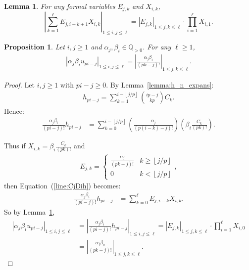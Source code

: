 \documentclass[10pt,a4paper]{amsart}
\newtheorem{lemma}{Lemma}
\newtheorem{prop}{Proposition}
\newcommand{\floor}[1]{\left \lfloor #1 \right \rfloor}
\begin{document}
\begin{lemma}\label{lemma:deter}
For any formal variables $E_{j,k}$ and $X_{i,k}$, 
\[
	|  \sum_{k=1}^{\ell} E_{j, i-k+1} X_{i,k} |_{1\leq i,j\leq \ell} = |E_{j,k}|_{1\leq j,k\leq \ell} \cdot \prod_{i=1}^\ell X_{i,1}.
\]
\end{lemma}

\begin{prop}\label{prop:CD_det}
Let $i,j\geq 1$ and $\alpha_j,\beta_i\in\mathbb{Q}_{>0}$. For any $\ell\geq 1$,
\begin{align*}
	|\alpha_j\beta_iu_{pi-j}|_{1\leq i,j\leq \ell} =  |\frac{\alpha_j\beta_i}{(pk-j)!}|_{1\leq j,k\leq \ell}.
\end{align*}
\end{prop}

\begin{proof}
Let $i,j\geq 1$ with $pi-j\geq 0$. By Lemma~\ref{lemma:h_n_expans}:
\begin{align*}
	h_{pi-j} = \sum_{k=1}^{i-\floor{j/p}}\binom{ip-j}{kp} C_k.
\end{align*}
Hence:
\begin{align}\label{line:CjDih}
	\frac{\alpha_j\beta_i}{(pi-j)!}h_{pi-j} &= \sum_{k=0}^{i-\floor{j/p}}\left (\frac{\alpha_j}{(p(i-k)-j)!}\right )\left (\beta_i\frac{C_k}{(pk)!}\right).
\end{align}

Thus if $X_{i,k} = \beta_i\frac{C_k}{(pk)!}$ and
\begin{align*}
E_{j, k} = \begin{cases}
		\frac{\alpha_j}{(pk-j)!} & k\geq  \floor{j/p}\\
		0 & k< \floor{j/p}
		\end{cases},
\end{align*} 
then Equation~(\ref{line:CjDih}) becomes:
\begin{align}
\frac{\alpha_j\beta_i}{(pi-j)!}h_{pi-j} &= \sum_{k=0}^{\ell}E_{j,i-k}X_{i,k}.
\end{align}
So by Lemma~\ref{lemma:deter},
\begin{align*}
	|\alpha_j\beta_iu_{pi-j}|_{1\leq i,j\leq \ell} &=|\frac{\alpha_j\beta_i}{(pi-j)!}h_{pi-j}|_{1\leq i,j\leq \ell} =  |E_{j,k}|_{1\leq j,k\leq \ell} \cdot \prod_{i=1}^\ell X_{i,0} \\
	&=  |\frac{\alpha_j\beta_k}{(pk-j)!}|_{1\leq j,k\leq \ell}.
\end{align*}
\end{proof}
\end{document}
